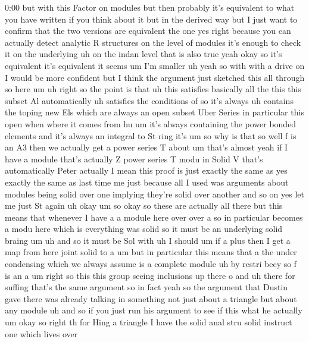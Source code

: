\begin{unfinished}{0:00}
but  with  this  Factor  on
modules  but  then  probably  it's
equivalent  to  what  you  have  written  if
you  think  about  it  but  in  the  derived
way  but  I  just  want  to  confirm  that  the
two  versions  are  equivalent  the  one  yes
right  because  you  can  actually  detect
analytic  R  structures  on  the  level  of
modules  it's  enough  to  check  it  on  the
underlying  uh  on  the  indan
level  that  is  also  true  yeah  okay  so
it's  equivalent  it's  equivalent  it
seems
um  I'm  smaller
uh  yeah  so  with  with  a  drive  on  I  would
be  more  confident  but  I  think  the
argument  just  sketched  this  all  through
so  here
um  uh
right  so  the  point  is  that  uh  this
satisfies  basically  all  the  this  this
subset  Al  automatically  uh  satisfies  the
conditions  of  so  it's  always  uh  contains
the  toping  new  Els  which  are  always  an
open  subset  Uber  Series  in  particular
this  open  when  where  it  comes  from  hu  um
it's  always  containing  the  power  bonded
elements  and  it's  always  an  integral  to
St
ring
it's
um  so  why  is  that
so  well  f  is  an
A3  then  we  actually  get  a  power  series
T
about
um  that's
almost
yeah  if  I  have  a
module  that's  actually  Z  power  series  T
modu  in  Solid
V  that's
automatically  Peter  actually  I  mean  this
proof  is  just  exactly  the
same  as  yes  exactly  the  same  as  last
time  me  just  because  all  I  used  was
arguments  about  modules  being  solid  over
one  implying  they're  solid  over  another
and  so  on  yes  let  me  just  St  again  uh
okay
um  so  okay  so  these  are  actually  all
there  but  this  means  that  whenever  I
have
a  a  module  here  over  over  a  so  in
particular  becomes  a  modu  here  which  is
everything  was  solid  so  it  must  be  an
underlying  solid  braing
um
uh  and  so  it  must  be  Sol  with
uh
I
should
um  if  a
plus  then  I  get  a  map  from  here  joint
solid  to
a  um  but  in  particular  this  means
that  a  the  under  condensing  which  we
always  assume  is  a  complete  module  uh
by  restri
becy  so  f  is  an
a
um  right  so  this  this  group  seeing
inclusions  up
there
o
and  uh  there  for
suffing  that's  the  same
argument  so  in  fact  yeah  so  the  argument
that  Dustin  gave  there  was  already
talking  in  something  not  just  about  a
triangle  but  about  any  module  uh  and  so
if  you  just  run  his  argument  to  see  if
this  what  he
actually
um  okay
so
right
th  for  Hing  a
triangle  I  have  the  solid  anal
stru  solid  instruct  one  which  lives  over

\end{unfinished}
